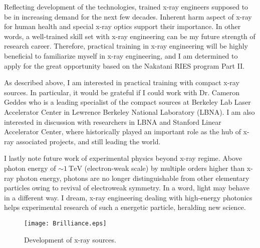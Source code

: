 \documentclass[aps,prb,reprint]{revtex4-1}
\begin{document}
Reflecting development of the technologies, trained x-ray engineers supposed to be in increasing demand for the next few decades. Inherent harm aspect of x-ray for human health\cite{Gonzalez} and special x-ray optics support their importance. In other words, a well-trained skill set with x-ray engineering can be my future strength of research career. Therefore, practical training in x-ray engineering will be highly beneficial to familiarize myself in x-ray engineering, and I am determined to apply for the great opportunity based on the Nakatani RIES program Part II.

As described above, I am interested in practical training with compact x-ray sources. In particular, it would be grateful if I could work with Dr. Cameron Geddes who is a leading specialist of the compact sources at Berkeley Lab Laser Accelerator Center in Lewrence Berkeley National Laboratory (LBNA). I am also interested in discussion with researchers in LBNA and Stanford Linear Accelerator Center, where historically played an important role as the hub of x-ray associated projects, and still leading the world.

I lastly note future work of experimental physics beyond x-ray regime.
Above photon energy of $\sim \mathrm{1\:TeV}$ (electron-weak scale) by multiple orders higher than x-ray photon energy, photons are no longer distinguishable from other elementary particles owing to revival of electroweak symmetry\cite{Barklow}. In a word, light may behave in a different way.
I dream, x-ray engineering dealing with high-energy photonics helps experimental research of such a energetic particle, heralding new science.

\setlength\textfloatsep{0.8em}
\setlength\abovecaptionskip{0em}
\begin{figure}[b]
  \center
    \texttt{[image: Brilliance.eps]}
     \label{fig:brilliance}
     \caption{Development of x-ray sources.}
\end{figure}


\end{document}
